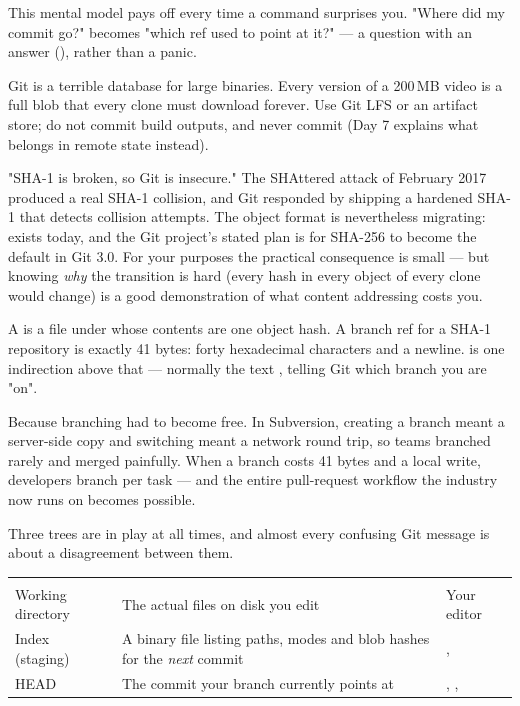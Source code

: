 This mental model pays off every time a command surprises you. "Where did my commit go?" becomes "which ref used to point at it?" --- a question with an answer (), rather than a panic.

 Git is a terrible database for large binaries. Every version of a 200\,MB video is a full blob that every clone must download forever. Use Git LFS or an artifact store; do not commit build outputs, and never commit  (Day 7 explains what belongs in remote state instead).

\begin{misconception}
"SHA-1 is broken, so Git is insecure." The SHAttered attack of February 2017 produced a real SHA-1 collision, and Git responded by shipping a hardened SHA-1 that detects collision attempts. The object format is nevertheless migrating:  exists today, and the Git project's stated plan is for SHA-256 to become the default in Git 3.0. For your purposes the practical consequence is small --- but knowing \emph{why} the transition is hard (every hash in every object of every clone would change) is a good demonstration of what content addressing costs you.
\end{misconception}


 A  is a file under  whose contents are one object hash. A branch ref for a SHA-1 repository is exactly 41 bytes: forty hexadecimal characters and a newline.  is one indirection above that --- normally the text , telling Git which branch you are "on".

 Because branching had to become free. In Subversion, creating a branch meant a server-side copy and switching meant a network round trip, so teams branched rarely and merged painfully. When a branch costs 41 bytes and a local write, developers branch per task --- and the entire pull-request workflow the industry now runs on becomes possible.

 Three trees are in play at all times, and almost every confusing Git message is about a disagreement between them.

\begin{center}\small
\wbrowcolors
\begin{tabularx}{\linewidth}{@{}L{26mm} X L{34mm}@{}}
 &  & \\
Working directory & The actual files on disk you edit & Your editor\\
Index (staging) & A binary file listing paths, modes and blob hashes for the \emph{next} commit & , \\
HEAD & The commit your branch currently points at & , , \\
\end{tabularx}
\end{center}

